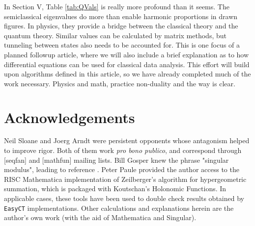 \documentclass[nofootinbib,preprint]{revtex4-1}
\begin{document}
In Section V, Table \ref{tab:QVals} is really more profound than it seems. The 
semiclassical eigenvalues do more than enable harmonic proportions in drawn 
figures. In physics, they provide a bridge between the classical theory and 
the quantum theory. Similar values can be calculated by matrix methods, but 
tunneling between states also needs to be accounted for. This is one focus
of a planned followup article, where we will also include a brief explanation
as to how differential equations can be used for classical data analysis.  
This effort will build upon algorithms defined in this article, so we have 
already completed much of the work necessary. Physics and math, practice 
non-duality and the way is clear.

\pagebreak

\section*{Acknowledgements}
Neil Sloane and Joerg Arndt were persistent opponents whose antagonism 
helped to improve rigor. Both of them work \textit{pro bono publico}, 
and correspond through [seqfan] and [mathfun] mailing lists. Bill Gosper 
knew the phrase "singular modulus", leading to reference \cite{VILLARINO2020}.
Peter Paule provided the author access to the RISC Mathematica implementation 
of Zeilberger's algorithm for hypergeometric summation, which is packaged 
with Koutschan's Holonomic Functions. In applicable cases, these tools 
have been used to double check results obtained by \texttt{EasyCT} 
implementations. Other calculations and explanations herein are the 
author's own work (with the aid of Mathematica and Singular). 




\pagebreak 
\end{document}
